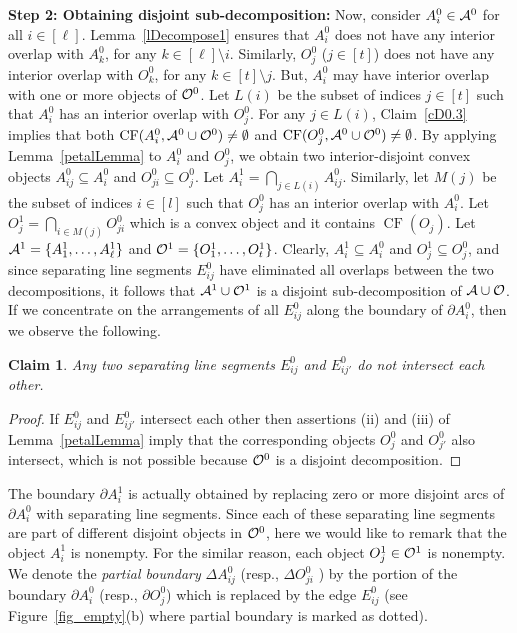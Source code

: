 \documentclass[a4paper,11pt]{article}
\DeclareMathOperator{\CF}{CF}
\newtheorem{claim}{Claim}
\begin{document}
{\bf Step 2: Obtaining disjoint sub-decomposition:} Now, consider $A^0_{i}\in {\cal A}^0$ for all 
$i\in [\ell]$. 
Lemma~\ref{lDecompose1} ensures that $A^0_{i}$ does not have any interior overlap with $A^0_{k}$, for any $k \in [\ell]\setminus i$. 
Similarly, ${O^0_j}$ ($j\in [t]$) does not have any  interior overlap with $O_k^0$, for any $k \in [t]\setminus j$. 
But, $A^0_{i}$ may have interior overlap with one or more objects of ${\cal O}^0$.
Let $L(i)$ be the subset of indices $j\in [t]$ such that $A_i^0$ has an interior overlap with $O_j^0$. 
For any $j \in L(i)$, Claim~\ref{cD0.3} implies that both $\CF(A^0_i, {\cal A}^0\cup {\cal O}^0)\neq \emptyset$ and $\CF(O^0_j, {\cal A}^0\cup {\cal O}^0)\neq \emptyset$. 
By applying Lemma~\ref{petalLemma} to $A^0_{i}$ and 
${O^0_j}$, we obtain two interior-disjoint convex objects $A_{ij}^0 \subseteq A_i^0$ and $O_{ji}^0 \subseteq O_j^0$. Let $A^1_i=\bigcap_{j \in L(i)}A_{ij}^0$.
 Similarly, let $M(j)$ be the subset of indices $i \in [l]$ such that $O_j^0$ has an interior overlap with $A_i^0$.  Let $O^1_j=\bigcap_{i\in M(j)} O^0_{ji} $ which is a convex object and it contains  $\CF(O_j)$.
Let  ${\cal A}^1=\{A^1_{1}, \ldots, A^1_{\ell}\}$ and   ${\cal O}^1=\{{O^1_{1}}, \ldots, {O^1_{t}}\}$. 
Clearly, $A_i^1 \subseteq A_i^0$ and $O_j^1 \subseteq O_j^0$, and since separating line segments $E_{ij}^0$ have eliminated all overlaps between the two decompositions, it follows that ${\cal A}^1 \cup {\cal O}^1$ is a disjoint sub-decomposition of  ${\cal A}\cup {\cal O}$.
If we concentrate on  the arrangements of all $E^0_{ij}$ along the boundary of 
$\partial A^0_{i}$, then we  observe the following.

\begin{claim}\label{cD1}
Any two separating line segments $E^0_{ij}$ and $E^0_{ij'}$  do not intersect each 
other.
\end{claim}
\begin{proof}
  If  $E^0_{ij}$ and $E^0_{ij'}$ intersect each 
other then assertions (ii) and (iii) of Lemma~\ref{petalLemma} imply that the corresponding  objects 
${O^0_j}$ and  $O_{j'}^0$ also intersect, which is not possible because ${\cal O}^0$ is a disjoint  
decomposition. 
\end{proof}

The boundary $\partial A^1_{i}$ is actually obtained by replacing zero or more disjoint arcs of $\partial A^0_{i}$ with  separating line segments. Since each of these separating line segments are part of different disjoint objects in ${\cal O}^0$, here we would like to remark that the object $A^1_{i}$ is nonempty. For the similar reason,  each object $O^1_{j}\in {\cal O}^1$ is nonempty.
We denote the {\it partial boundary} $\Delta {A^0_{ij}}$ (resp., $\Delta {O^0_{ji}}$ ) by 
the portion 
of the boundary $\partial A^0_{i}$ (resp., 
$\partial {O^0_j}$) which is replaced by the edge   
$E^0_{ij}$ (see Figure~\ref{fig_empty}(b) where partial boundary is marked as 
dotted).
\end{document}
